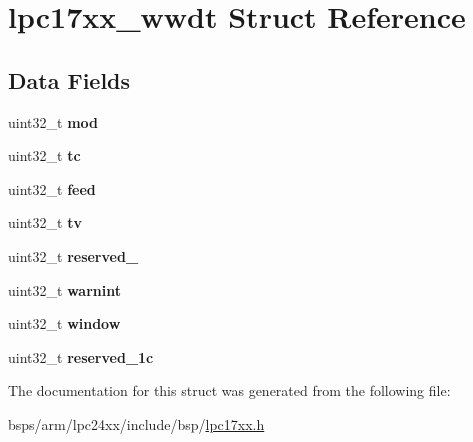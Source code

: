 \hypertarget{structlpc17xx__wwdt}{}\section{lpc17xx\+\_\+wwdt Struct Reference}
\label{structlpc17xx__wwdt}
\subsection*{Data Fields}
\begin{DoxyCompactItemize}
\item 
\mbox{\label{structlpc17xx__wwdt_a507c513e84da074efbae199fcba9942e}} 
uint32\+\_\+t {\bfseries mod}
\item 
\mbox{\label{structlpc17xx__wwdt_aa3bca8402aee2b46015c3b3289a9f57c}} 
uint32\+\_\+t {\bfseries tc}
\item 
\mbox{\label{structlpc17xx__wwdt_af0b8d6cdb76c3fc85607bc905b81ee35}} 
uint32\+\_\+t {\bfseries feed}
\item 
\mbox{\label{structlpc17xx__wwdt_a7d640b77f75d6c06e7519ff5212b4e45}} 
uint32\+\_\+t {\bfseries tv}
\item 
\mbox{\label{structlpc17xx__wwdt_a161e8945b2fb385b67d26e9eac20989c}} 
uint32\+\_\+t {\bfseries reserved\+\_}
\item 
\mbox{\label{structlpc17xx__wwdt_afe44386fac449c76b6e730afca123b8e}} 
uint32\+\_\+t {\bfseries warnint}
\item 
\mbox{\label{structlpc17xx__wwdt_a3fe91860fdd03525309f9e66d78ff5e5}} 
uint32\+\_\+t {\bfseries window}
\item 
\mbox{\label{structlpc17xx__wwdt_aead7cd7467353fffa7c53dbcb24f5fbb}} 
uint32\+\_\+t {\bfseries reserved\+\_\+1c}
\end{DoxyCompactItemize}


The documentation for this struct was generated from the following file\+:\begin{DoxyCompactItemize}
\item 
bsps/arm/lpc24xx/include/bsp/\mbox{\hyperlink{lpc17xx_8h}{lpc17xx.\+h}}\end{DoxyCompactItemize}
